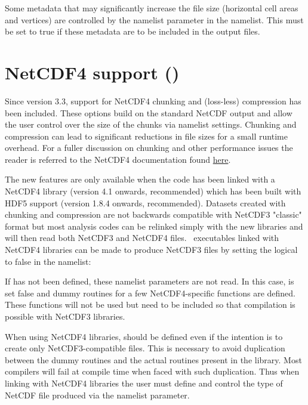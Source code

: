 \documentclass[../main/NEMO_manual]{subfiles}
\begin{document}
Some metadata that may significantly increase the file size (horizontal cell areas and vertices) are controlled by
the namelist parameter  in the  namelist.
This must be set to true if these metadata are to be included in the output files.

\section[NetCDF4 support (\texttt{\textbf{key\_netcdf4}})]{NetCDF4 support (\protect{})}
\label{sec:DIA_nc4}

Since version 3.3, support for NetCDF4 chunking and (loss-less) compression has been included.
These options build on the standard NetCDF output and allow the user control over the size of the chunks via
namelist settings.
Chunking and compression can lead to significant reductions in file sizes for a small runtime overhead.
For a fuller discussion on chunking and other performance issues the reader is referred to
the NetCDF4 documentation found \href{https://www.unidata.ucar.edu/software/netcdf/docs/netcdf_perf_chunking.html}{here}.

The new features are only available when the code has been linked with a NetCDF4 library
(version 4.1 onwards, recommended) which has been built with HDF5 support (version 1.8.4 onwards, recommended).
Datasets created with chunking and compression are not backwards compatible with NetCDF3 "classic" format but
most analysis codes can be relinked simply with the new libraries and will then read both NetCDF3 and NetCDF4 files.
\NEMO\ executables linked with NetCDF4 libraries can be made to produce NetCDF3 files by
setting the  logical to false in the  namelist:

\begin{listing}
  \caption{}
  \label{lst:namnc4}
\end{listing}

If  has not been defined, these namelist parameters are not read.
In this case,  is set false and dummy routines for a few NetCDF4-specific functions are defined.
These functions will not be used but need to be included so that compilation is possible with NetCDF3 libraries.

When using NetCDF4 libraries,  should be defined even if the intention is to
create only NetCDF3-compatible files.
This is necessary to avoid duplication between the dummy routines and the actual routines present in the library.
Most compilers will fail at compile time when faced with such duplication.
Thus when linking with NetCDF4 libraries the user must define  and
control the type of NetCDF file produced via the namelist parameter.
\end{document}
